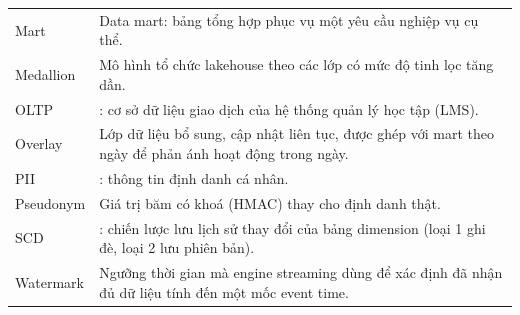 {\begin{longtable}{@{}L{3.4cm}L{11.2cm}@{}}
Mart & Data mart: bảng tổng hợp phục vụ một yêu cầu nghiệp vụ cụ thể. \\
Medallion & Mô hình tổ chức lakehouse theo các lớp có mức độ tinh lọc tăng dần. \\
OLTP & : cơ sở dữ liệu giao dịch của hệ thống quản lý học tập (LMS). \\
Overlay & Lớp dữ liệu bổ sung, cập nhật liên tục, được ghép với mart theo ngày để phản ánh hoạt động trong ngày. \\
PII & : thông tin định danh cá nhân. \\
Pseudonym & Giá trị băm có khoá (HMAC) thay cho định danh thật. \\
SCD & : chiến lược lưu lịch sử thay đổi của bảng dimension (loại 1 ghi đè, loại 2 lưu phiên bản). \\
Watermark & Ngưỡng thời gian mà engine streaming dùng để xác định đã nhận đủ dữ liệu tính đến một mốc event time. \\
\bottomrule
\end{longtable}}
